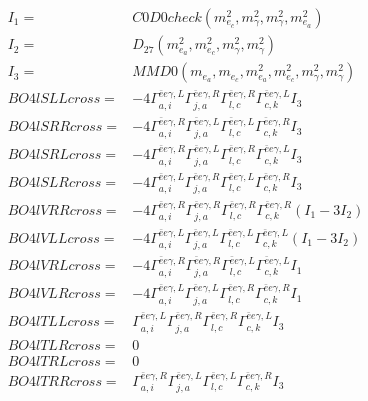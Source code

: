 \documentclass[A4,landscape]{article}
\begin{document}
\begin{align} 
I_1 = & C0D0check(m^2_{e_{{c}}}, m^2_{\gamma}, m^2_{\gamma}, m^2_{e_{{a}}}) \\ 
I_2 = & D_{27}(m^2_{e_{{a}}}, m^2_{e_{{c}}}, m^2_{\gamma}, m^2_{\gamma}) \\ 
I_3 = & MMD0(m_{e_{{a}}}, m_{e_{{c}}}, m^2_{e_{{a}}}, m^2_{e_{{c}}}, m^2_{\gamma}, m^2_{\gamma}) \\ 
  BO4lSLLcross= & -4  \Gamma^{\bar{e}e \gamma ,L}_{a, i} \Gamma^{\bar{e}e \gamma ,R}_{j, a} \Gamma^{\bar{e}e \gamma ,R}_{l, c} \Gamma^{\bar{e}e \gamma ,L}_{c, k} I_3 \\ 
  BO4lSRRcross= & -4  \Gamma^{\bar{e}e \gamma ,R}_{a, i} \Gamma^{\bar{e}e \gamma ,L}_{j, a} \Gamma^{\bar{e}e \gamma ,L}_{l, c} \Gamma^{\bar{e}e \gamma ,R}_{c, k} I_3 \\ 
  BO4lSRLcross= & -4  \Gamma^{\bar{e}e \gamma ,R}_{a, i} \Gamma^{\bar{e}e \gamma ,L}_{j, a} \Gamma^{\bar{e}e \gamma ,R}_{l, c} \Gamma^{\bar{e}e \gamma ,L}_{c, k} I_3 \\ 
  BO4lSLRcross= & -4  \Gamma^{\bar{e}e \gamma ,L}_{a, i} \Gamma^{\bar{e}e \gamma ,R}_{j, a} \Gamma^{\bar{e}e \gamma ,L}_{l, c} \Gamma^{\bar{e}e \gamma ,R}_{c, k} I_3 \\ 
  BO4lVRRcross= & -4  \Gamma^{\bar{e}e \gamma ,R}_{a, i} \Gamma^{\bar{e}e \gamma ,R}_{j, a} \Gamma^{\bar{e}e \gamma ,R}_{l, c} \Gamma^{\bar{e}e \gamma ,R}_{c, k} (I_1 - 3 I_2) \\ 
  BO4lVLLcross= & -4  \Gamma^{\bar{e}e \gamma ,L}_{a, i} \Gamma^{\bar{e}e \gamma ,L}_{j, a} \Gamma^{\bar{e}e \gamma ,L}_{l, c} \Gamma^{\bar{e}e \gamma ,L}_{c, k} (I_1 - 3 I_2) \\ 
  BO4lVRLcross= & -4  \Gamma^{\bar{e}e \gamma ,R}_{a, i} \Gamma^{\bar{e}e \gamma ,R}_{j, a} \Gamma^{\bar{e}e \gamma ,L}_{l, c} \Gamma^{\bar{e}e \gamma ,L}_{c, k} I_1 \\ 
  BO4lVLRcross= & -4  \Gamma^{\bar{e}e \gamma ,L}_{a, i} \Gamma^{\bar{e}e \gamma ,L}_{j, a} \Gamma^{\bar{e}e \gamma ,R}_{l, c} \Gamma^{\bar{e}e \gamma ,R}_{c, k} I_1 \\ 
  BO4lTLLcross= &  \Gamma^{\bar{e}e \gamma ,L}_{a, i} \Gamma^{\bar{e}e \gamma ,R}_{j, a} \Gamma^{\bar{e}e \gamma ,R}_{l, c} \Gamma^{\bar{e}e \gamma ,L}_{c, k} I_3 \\ 
  BO4lTLRcross= & 0 \\ 
  BO4lTRLcross= & 0 \\ 
  BO4lTRRcross= &  \Gamma^{\bar{e}e \gamma ,R}_{a, i} \Gamma^{\bar{e}e \gamma ,L}_{j, a} \Gamma^{\bar{e}e \gamma ,L}_{l, c} \Gamma^{\bar{e}e \gamma ,R}_{c, k} I_3 \\ 
\end{align} 
\end{document}

